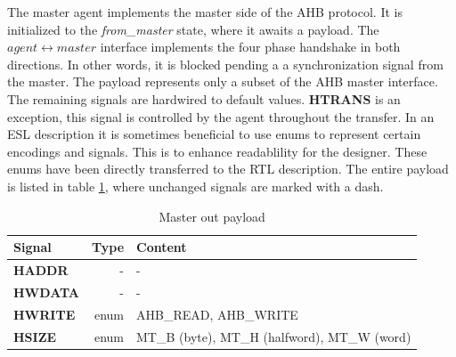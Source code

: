The master agent implements the master side of the AHB protocol. It is initialized to the \textit{from\_master} state, where it awaits a payload. The $agent\leftrightarrow master$ interface implements the four phase handshake in both directions. In other words, it is blocked pending a a synchronization signal from the master. The payload represents only a subset of the AHB master interface. The remaining signals are hardwired to default values. \textbf{HTRANS} is an exception, this signal is controlled by the agent throughout the transfer. In an ESL description it is sometimes beneficial to use enums to represent certain encodings and signals. This is to enhance readablility for the designer. These enums have been directly transferred to the RTL description. The entire payload is listed in table \ref{tab:mpayload}, where unchanged signals are marked with a dash.  

\begin{table}[hbt] 
  \label{tab:mpayload}
  \begin{tabular}{|p{25mm}|r|p{10cm}|} 
  \hline
  \textbf{Signal} & \textbf{Type} & \textbf{Content} \\
    \hline
  \textbf{HADDR} & - & - \\
    \hline
  \textbf{HWDATA} & - & - \\
    \hline
  \textbf{HWRITE} & enum & AHB\_READ, AHB\_WRITE \\
    \hline  
\textbf{HSIZE} & enum & MT\_B (byte), MT\_H (halfword), MT\_W (word) \\
    \hline
  \end{tabular}
\caption{Master out payload}
\end{table}

